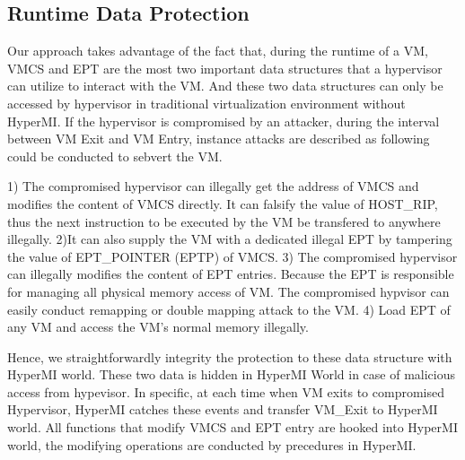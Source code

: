 \documentclass[conference]{IEEEtran}
\begin{document}
\subsection{Runtime Data Protection}\label {RDP}

Our approach takes advantage of the fact that, during the runtime of a VM, VMCS and EPT are the most two important data structures that a hypervisor can utilize to interact with the VM. And these two data structures can only be accessed by hypervisor in traditional virtualization environment without HyperMI. If the hypervisor is compromised by an attacker, during the interval between VM Exit and VM Entry, instance attacks are described as following could be conducted to sebvert the VM. 

1) The compromised hypervisor can illegally get the address of VMCS and modifies the content of VMCS directly. It can falsify the value of HOST\_RIP, thus the next instruction to be executed by the VM be transfered to anywhere illegally.
2)It can also supply the VM with a dedicated illegal EPT by tampering the value of EPT\_POINTER (EPTP) of VMCS. 
3) The compromised hypervisor can illegally modifies the content of EPT entries. Because the EPT is responsible for managing all physical memory access of VM. The compromised hypvisor can easily conduct remapping or double mapping attack to the VM.
4) Load EPT of any VM and access the VM's normal memory illegally.

Hence, we straightforwardly integrity the protection to these data structure with HyperMI world. These two data is hidden in HyperMI World in case of malicious access from hypevisor. In specific, at each time when VM exits to compromised Hypervisor, HyperMI catches these events and transfer VM\_Exit to HyperMI world. All functions that modify VMCS and EPT entry are hooked into HyperMI world, the modifying operations are conducted by precedures in HyperMI. 
\end{document}
